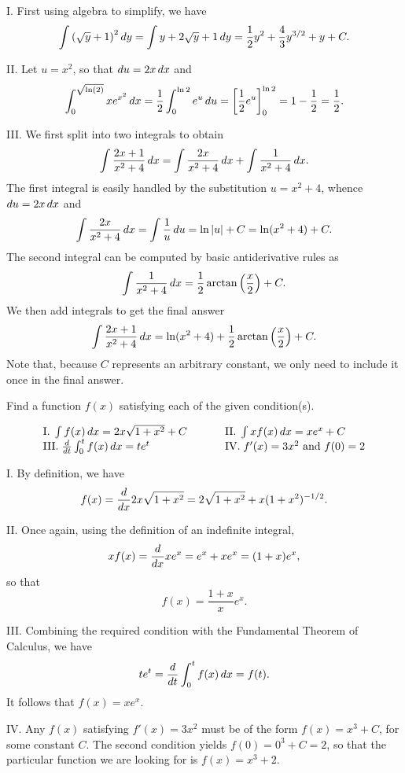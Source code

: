 \documentclass[handout]{ximera}
\begin{document}
\begin{freeResponse} I. First using algebra to simplify, we have
$$
\int \left(\sqrt{y}+1\right)^2 \mathop{}\!d y = \int y + 2 \sqrt{y} + 1 \mathop{}\!d y = \frac{1}{2}y^2 + \frac{4}{3} y^{3/2} + y + C.
$$

II. Let $u = x^2$, so that $\mathop{}\!d u = 2 x \mathop{}\!d x$ and 
$$
\int_0^{\sqrt{\ln(2)}} x e^{x^2} \mathop{}\!d x = \frac{1}{2} \int_0 ^{\ln 2} e^u \mathop{}\!d u = \bigg[ \frac{1}{2} e^u \bigg]_0^{\ln 2} = 1- \frac{1}{2} = \frac{1}{2}.
$$

III. We first split into two integrals to obtain 
$$
\int \frac{2x+1}{x^2+4} \mathop{}\!d x = \int \frac{2x}{x^2 + 4} \mathop{}\!d x + \int \frac{1}{x^2 + 4} \mathop{}\!d x.
$$
The first integral is easily handled by the substitution $u = x^2 + 4$, whence $\mathop{}\!d u = 2 x \mathop{}\!d x$ and 
$$
\int \frac{2x}{x^2 + 4} \mathop{}\!d x = \int \frac{1}{u} \mathop{}\!d u = \ln |u| + C = \ln (x^2 + 4) + C.
$$
The second integral can be computed by basic antiderivative rules as 
$$
\int \frac{1}{x^2 + 4} \mathop{}\!d x = \frac{1}{2} \arctan \left(\frac{x}{2}\right) + C.
$$
We then add integrals to get the final answer
$$
\int \frac{2x+1}{x^2+4} \mathop{}\!d x = \ln (x^2 + 4) + \frac{1}{2} \arctan \left(\frac{x}{2}\right) + C.
$$
Note that, because $C$ represents an arbitrary constant, we only need to include it once in the final answer.
\end{freeResponse}

\begin{problem}
Find a function $f(x)$ satisfying each of the given condition(s).

$$
\begin{array}{lll}
\mathrm{I.} \; \int f(x) \mathop{}\!d x = 2x \sqrt{1+ x^2} + C & \hspace{.2in} & \mathrm{II.} \; \int xf(x) \mathop{}\!d x = x e^x + C \\
\mathrm{III.} \; \frac{\mathop{}\!d}{\mathop{}\!d t} \int_0^t f(x) \mathop{}\!d x = t e^t & \hspace{.2in} & \mathrm{IV.} \; f'(x) = 3x^2 \mbox{ and } f(0)=2
\end{array}
$$
\end{problem}

\begin{freeResponse} I. By definition, we have
$$
f(x) = \frac{\mathop{}\!d}{\mathop{}\!d x}  2x \sqrt{1+ x^2}  = 2 \sqrt{1+x^2} + x  (1+x^2)^{-1/2}.
$$

II. Once again, using the definition of an indefinite integral, 
$$
x f(x) = \frac{\mathop{}\!d}{\mathop{}\!d x} x e^x = e^x + x e^x = (1+x)e^x,
$$
so that 
$$
f(x) = \frac{1+x}{x} e^x.
$$

III. Combining the required condition with the Fundamental Theorem of Calculus, we have
$$
te^t = \frac{\mathop{}\!d}{\mathop{}\!d t} \int_0^t f(x) \mathop{}\!d x = f(t).
$$
It follows that $f(x) = x e^x$.

IV. Any $f(x)$ satisfying $f'(x) = 3x^2$ must be of the form $f(x) = x^3 + C$, for some constant $C$. The second condition yields $f(0)=0^3 + C = 2$, so that the particular function we are looking for is $f(x) = x^3 + 2$. 
\end{freeResponse}
\end{document}
